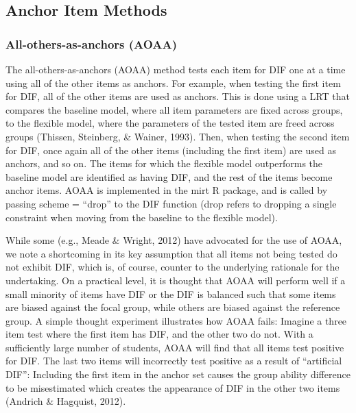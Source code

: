 \documentclass[
  english,
  man,floatsintext]{apa6}
\begin{document}
\hypertarget{anchor-item-methods}{%
\subsection{Anchor Item Methods}\label{anchor-item-methods}}

\hypertarget{all-others-as-anchors-aoaa}{%
\subsubsection{All-others-as-anchors (AOAA)}\label{all-others-as-anchors-aoaa}}

The all-others-as-anchors (AOAA) method tests each item for DIF one at a time using all of the other items as anchors. For example, when testing the first item for DIF, all of the other items are used as anchors. This is done using a LRT that compares the baseline model, where all item parameters are fixed across groups, to the flexible model, where the parameters of the tested item are freed across groups (Thissen, Steinberg, \& Wainer, 1993). Then, when testing the second item for DIF, once again all of the other items (including the first item) are used as anchors, and so on. The items for which the flexible model outperforms the baseline model are identified as having DIF, and the rest of the items become anchor items. AOAA is implemented in the mirt R package, and is called by passing scheme = ``drop'' to the DIF function (drop refers to dropping a single constraint when moving from the baseline to the flexible model).

While some (e.g., Meade \& Wright, 2012) have advocated for the use of AOAA, we note a shortcoming in its key assumption that all items not being tested do not exhibit DIF, which is, of course, counter to the underlying rationale for the undertaking. On a practical level, it is thought that AOAA will perform well if a small minority of items have DIF or the DIF is balanced such that some items are biased against the focal group, while others are biased against the reference group. A simple thought experiment illustrates how AOAA fails: Imagine a three item test where the first item has DIF, and the other two do not. With a sufficiently large number of students, AOAA will find that all items test positive for DIF. The last two items will incorrectly test positive as a result of ``artificial DIF'': Including the first item in the anchor set causes the group ability difference to be misestimated which creates the appearance of DIF in the other two items (Andrich \& Hagquist, 2012).
\end{document}
